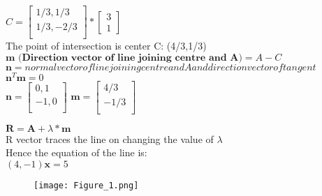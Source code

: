 \documentclass{beamer}
\begin{document}
\begin{frame}
$C = 
\begin{bmatrix}
1/3,1/3\\
1/3,-2/3\\
\end{bmatrix}
* 
 \begin{bmatrix}
3\\
1
\end{bmatrix}$\\
The point of intersection is center C:   (4/3,1/3)\\
$\textbf{m (Direction vector of line joining centre and A)} = A - C$\\
$\textbf{n} = normal vector of line joining centre and A and direction vector of tangent$\\
$\textbf{n}^{T} \textbf{m} = 0$\\
$\textbf{n} = 
\begin{bmatrix}
0,1\\
-1,0\\
\end{bmatrix}$
$\textbf{m}
 =   
 \begin{bmatrix}
4/3\\
-1/3\\
\end{bmatrix}$


$\textbf{R} = \textbf{A} + \lambda * \textbf{m}$\\
R vector traces the line on changing the value of $\lambda$ \\ 
Hence the equation of the line is: \\ 
$(4,-1)\textbf{x} = 5$\\
\end{frame}

\begin{frame}
\begin{figure}
  
    \texttt{[image: Figure\_1.png]}

\end{figure}
\end{frame}
\end{document}

